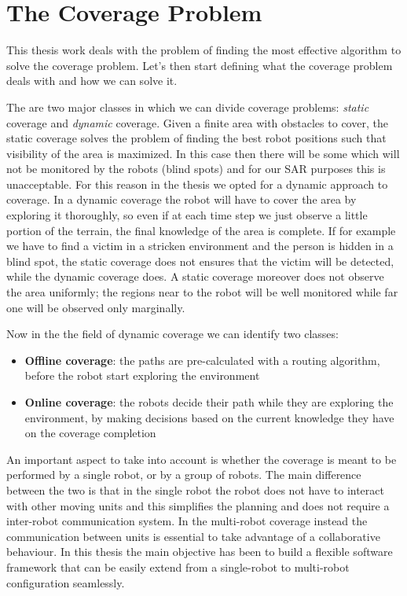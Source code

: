 \section{The Coverage Problem}

This thesis work deals with the problem of finding the most effective algorithm to solve the coverage problem. Let's then start defining what the coverage problem deals with and how we can solve it.

 The are two major classes in which we can divide coverage problems: \emph{static} coverage and \emph{dynamic} coverage. Given a finite area with obstacles to cover, the static coverage solves the problem of finding the best robot positions such that visibility of the area is maximized. In this case then there will be some which will not be monitored by the robots (blind spots) and for our SAR purposes this is unacceptable. For this reason in the thesis we opted for a dynamic approach to coverage. In a dynamic coverage the robot will have to cover the area by exploring it thoroughly, so even if at each time step we just observe a little portion of the terrain, the final knowledge of the area is complete. If for example we have to find a victim in a stricken environment and the person is hidden in a blind spot, the static coverage does not ensures that the victim will be detected, while the dynamic coverage does. A static coverage moreover does not observe the area uniformly; the regions near to the robot will be well monitored while far one will be observed only marginally.
 
Now in the the field of dynamic coverage we can identify two classes:
\begin{itemize}
\item \textbf{Offline coverage}: the paths are pre-calculated with a routing algorithm, before the robot start exploring the environment
\item \textbf{Online coverage}: the robots decide their path while they are exploring the environment, by making decisions based on the current knowledge they have on the coverage completion
\end{itemize}

An important aspect to take into account is whether the coverage is meant to be performed by a single robot, or by a group of robots. The main difference between the two is that in the single robot the robot does not have to interact with other moving units and this simplifies the planning and does not require a inter-robot communication system. In the multi-robot coverage instead the communication between units is essential to take advantage of a collaborative behaviour. In this thesis the main objective has been to build a flexible software framework that can  be easily extend from a single-robot to multi-robot configuration seamlessly.


